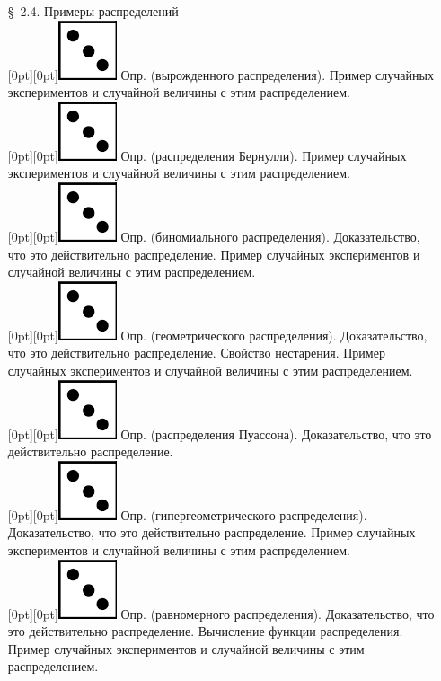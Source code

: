 \documentclass[10pt]{amsart}
\begin{document}
\begin{enumerate}
\begin{enumerate}
\item[\S\, 2.4.] Примеры распределений \\
    
 \raisebox{-1pt}[0pt][0pt]{\includegraphics[width=0.02\linewidth]{3.png}} Опр. (вырожденного распределения). Пример случайных экспериментов и случайной величины с этим распределением. \\
 \raisebox{-1pt}[0pt][0pt]{\includegraphics[width=0.02\linewidth]{3.png}} Опр. (распределения Бернулли).  Пример случайных экспериментов и случайной величины с этим распределением. \\
 \raisebox{-1pt}[0pt][0pt]{\includegraphics[width=0.02\linewidth]{3.png}}  Опр. (биномиального распределения). Доказательство, что это действительно распределение. Пример случайных экспериментов и случайной величины с этим распределением. \\     
 \raisebox{-1pt}[0pt][0pt]{\includegraphics[width=0.02\linewidth]{3.png}}  Опр. (геометрического распределения). Доказательство, что это действительно распределение. Свойство нестарения. Пример случайных экспериментов и случайной величины с этим распределением. \\      
 \raisebox{-1pt}[0pt][0pt]{\includegraphics[width=0.02\linewidth]{3.png}}  Опр. (распределения Пуассона). Доказательство, что это действительно распределение. \\
 \raisebox{-1pt}[0pt][0pt]{\includegraphics[width=0.02\linewidth]{3.png}} Опр. (гипергеометрического распределения). Доказательство, что это действительно распределение. Пример случайных экспериментов и случайной величины с этим распределением. \\      
 \raisebox{-1pt}[0pt][0pt]{\includegraphics[width=0.02\linewidth]{3.png}}  Опр. (равномерного распределения). Доказательство, что это действительно распределение. Вычисление функции распределения. Пример случайных экспериментов и случайной величины с этим распределением. \\

\end{enumerate}
\end{enumerate}
\end{document}
